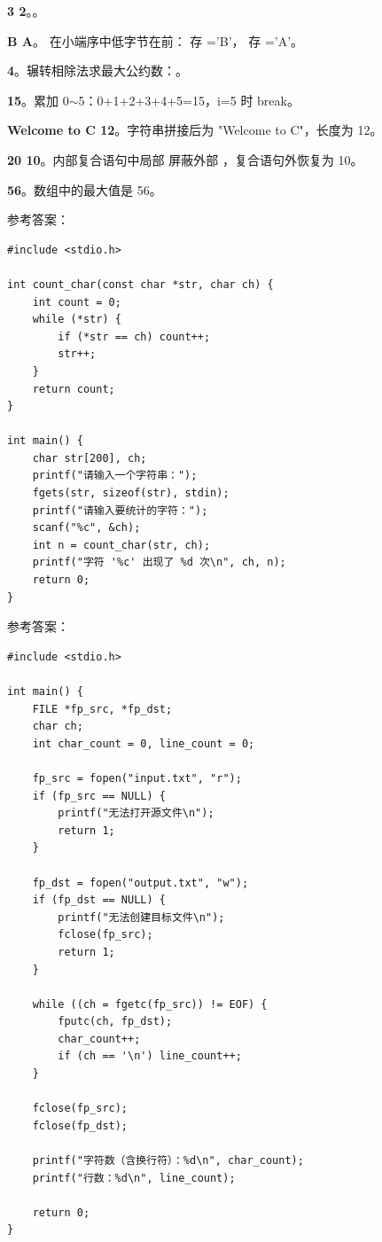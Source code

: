 \documentclass[a4paper,11pt]{article}
\begin{document}
\q \textbf{3 2}。。

\q \textbf{B A}。 在小端序中低字节在前： 存 ='B'， 存 ='A'。

\q \textbf{4}。辗转相除法求最大公约数：。

\q \textbf{15}。累加 0$\sim$5：0+1+2+3+4+5=15，i=5 时 break。

\q \textbf{Welcome to C 12}。字符串拼接后为 "Welcome to C"，长度为 12。

\q \textbf{20 10}。内部复合语句中局部  屏蔽外部 ，复合语句外恢复为 10。

\q \textbf{56}。数组中的最大值是 56。


\pq 参考答案：
\begin{lstlisting}[language={[custom]C}]
#include <stdio.h>

int count_char(const char *str, char ch) {
    int count = 0;
    while (*str) {
        if (*str == ch) count++;
        str++;
    }
    return count;
}

int main() {
    char str[200], ch;
    printf("请输入一个字符串：");
    fgets(str, sizeof(str), stdin);
    printf("请输入要统计的字符：");
    scanf("%c", &ch);
    int n = count_char(str, ch);
    printf("字符 '%c' 出现了 %d 次\n", ch, n);
    return 0;
}
\end{lstlisting}

\pq 参考答案：
\begin{lstlisting}[language={[custom]C}]
#include <stdio.h>

int main() {
    FILE *fp_src, *fp_dst;
    char ch;
    int char_count = 0, line_count = 0;

    fp_src = fopen("input.txt", "r");
    if (fp_src == NULL) {
        printf("无法打开源文件\n");
        return 1;
    }

    fp_dst = fopen("output.txt", "w");
    if (fp_dst == NULL) {
        printf("无法创建目标文件\n");
        fclose(fp_src);
        return 1;
    }

    while ((ch = fgetc(fp_src)) != EOF) {
        fputc(ch, fp_dst);
        char_count++;
        if (ch == '\n') line_count++;
    }

    fclose(fp_src);
    fclose(fp_dst);

    printf("字符数（含换行符）：%d\n", char_count);
    printf("行数：%d\n", line_count);

    return 0;
}
\end{lstlisting}
\end{document}
